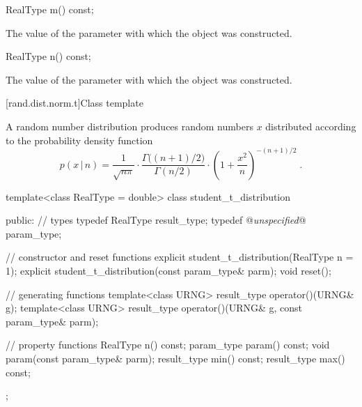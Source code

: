 %
%
\begin{itemdecl}
RealType m() const;
\end{itemdecl}

\begin{itemdescr}
\pnum\returns The value of the  parameter
 with which the object was constructed.
\end{itemdescr}

%
%
\begin{itemdecl}
RealType n() const;
\end{itemdecl}

\begin{itemdescr}
\pnum\returns The value of the  parameter
 with which the object was constructed.
\end{itemdescr}


[rand.dist.norm.t]{Class template }%
%

\pnum
A  random number distribution
produces random numbers $x$
distributed according to
the probability density function%
%
\[%
 p(x\,|\,n)
      =  \frac{1}
              {\sqrt{n \pi}}
         \cdot \frac{\Gamma\big((n+1)/2\big)}
                    {\Gamma(n/2)}
         \cdot \left( 1+\frac{x^2}{n} \right) ^ {-(n+1)/2}
\; \mbox{.}
\]

\begin{codeblock}
template<class RealType = double>
 class student_t_distribution
{
public:
 // types
 typedef RealType result_type;
 typedef @\textit{unspecified}@ param_type;

 // constructor and reset functions
 explicit student_t_distribution(RealType n = 1);
 explicit student_t_distribution(const param_type& parm);
 void reset();

 // generating functions
 template<class URNG>
   result_type operator()(URNG& g);
 template<class URNG>
   result_type operator()(URNG& g, const param_type& parm);

 // property functions
 RealType n() const;
 param_type param() const;
 void param(const param_type& parm);
 result_type min() const;
 result_type max() const;
};
\end{codeblock}



